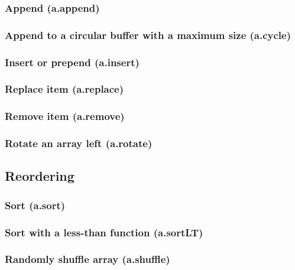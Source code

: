 \documentclass{article}
\theoremstyle{definition}
\begin{document}
\subsubsection{Append (a.append)}

\subsubsection{Append to a circular buffer with a maximum size (a.cycle)}

\subsubsection{Insert or prepend (a.insert)}

\subsubsection{Replace item (a.replace)}

\subsubsection{Remove item (a.remove)}

\subsubsection{Rotate an array left (a.rotate)}

\subsection{Reordering}

\subsubsection{Sort (a.sort)}

\subsubsection{Sort with a less-than function (a.sortLT)}

\subsubsection{Randomly shuffle array (a.shuffle)}
\end{document}
